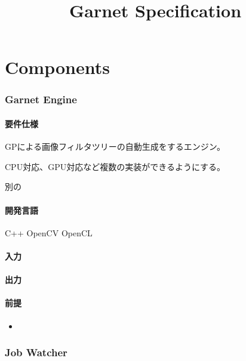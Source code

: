 \documentclass{jsbook}
\title{Garnet Specification}
\begin{document}
\setcounter{tocdepth}{2}
\tableofcontents


\chapter{Components}

\subsection{Garnet Engine}

\subsubsection{要件仕様}

GPによる画像フィルタツリーの自動生成をするエンジン。

CPU対応、GPU対応など複数の実装ができるようにする。

別の

\subsubsection{開発言語}

C++
OpenCV
OpenCL

\subsubsection{入力}

\subsubsection{出力}

\subsubsection{前提}


\begin{itemize}
    \item
\end{itemize}

\subsection{Job Watcher}

\subsubsection{}
\end{document}
